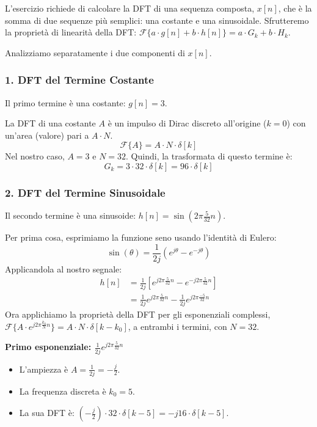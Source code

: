 
\begin{soluzione}{13}
    L'esercizio richiede di calcolare la DFT di una sequenza composta, $x[n]$, che è la somma di due sequenze più semplici: una costante e una sinusoidale. Sfrutteremo la proprietà di linearità della DFT: $\mathcal{F}\{a \cdot g[n] + b \cdot h[n]\} = a \cdot G_k + b \cdot H_k$.
    
    Analizziamo separatamente i due componenti di $x[n]$.

    \subsubsection*{1. DFT del Termine Costante}
    Il primo termine è una costante: $g[n] = 3$.
    
    La DFT di una costante $A$ è un impulso di Dirac discreto all'origine ($k=0$) con un'area (valore) pari a $A \cdot N$.
    \[
        \mathcal{F}\{A\} = A \cdot N \cdot \delta[k]
    \]
    Nel nostro caso, $A=3$ e $N=32$. Quindi, la trasformata di questo termine è:
    \[
        G_k = 3 \cdot 32 \cdot \delta[k] = 96 \cdot \delta[k]
    \]

    \subsubsection*{2. DFT del Termine Sinusoidale}
    Il secondo termine è una sinusoide: $h[n] = \sin\left(2\pi \frac{5}{32} n\right)$.
    
    Per prima cosa, esprimiamo la funzione seno usando l'identità di Eulero:
    \[
        \sin(\theta) = \frac{1}{2j}(e^{j\theta} - e^{-j\theta})
    \]
    Applicandola al nostro segnale:
    \begin{align*}
        h[n] &= \frac{1}{2j} \left[ e^{j2\pi\frac{5}{32}n} - e^{-j2\pi\frac{5}{32}n} \right] \\
        &= \frac{1}{2j} e^{j2\pi\frac{5}{32}n} - \frac{1}{2j} e^{j2\pi\frac{-5}{32}n}
    \end{align*}
    Ora applichiamo la proprietà della DFT per gli esponenziali complessi, $\mathcal{F}\{A \cdot e^{j2\pi\frac{k_0}{N}n}\} = A \cdot N \cdot \delta[k-k_0]$, a entrambi i termini, con $N=32$.
    
    \textbf{Primo esponenziale: $\frac{1}{2j} e^{j2\pi\frac{5}{32}n}$}
    \begin{itemize}
        \item L'ampiezza è $A = \frac{1}{2j} = -\frac{j}{2}$.
        \item La frequenza discreta è $k_0 = 5$.
        \item La sua DFT è: $(-\frac{j}{2}) \cdot 32 \cdot \delta[k - 5] = -j16 \cdot \delta[k - 5]$.
    \end{itemize}
    

\end{soluzione}

